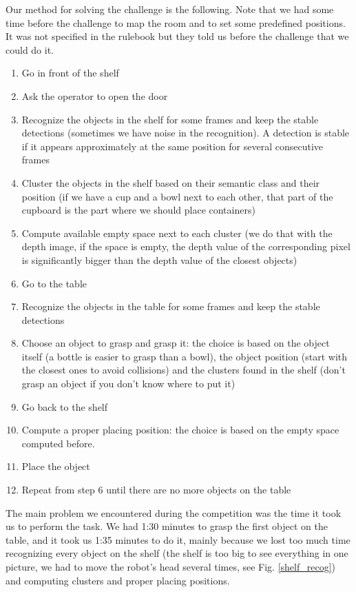 \documentclass[a4paper, twocolumn]{article}
\begin{document}
    Our method for solving the challenge is the following. Note that we had some time before the challenge to map the room and to set some predefined positions. It was not specified in the rulebook but they told us before the challenge that we could do it.
    \begin{enumerate}
        \item Go in front of the shelf
        \item Ask the operator to open the door
        \item Recognize the objects in the shelf for some frames and keep the stable detections (sometimes we have noise in the recognition). A detection is stable if it appears approximately at the same position for several consecutive frames
        \item Cluster the objects in the shelf based on their semantic class and their position (if we have a cup and a bowl next to each other, that part of the cupboard is the part where we should place containers)
        \item Compute available empty space next to each cluster (we do that with the depth image, if the space is empty, the depth value of the corresponding pixel is significantly bigger than the depth value of the closest objects)
        \item Go to the table
        \item Recognize the objects in the table for some frames and keep the stable detections
        \item Choose an object to grasp and grasp it: the choice is based on the object itself (a bottle is easier to grasp than a bowl), the object position (start with the closest ones to avoid collisions) and the clusters found in the shelf (don't grasp an object if you don't know where to put it)
        \item Go back to the shelf
        \item Compute a proper placing position: the choice is based on the empty space computed before.
        \item Place the object
        \item Repeat from step 6 until there are no more objects on the table
    \end{enumerate}

    The main problem we encountered during the competition was the time it took us to perform the task. We had 1:30 minutes to grasp the first object on the table, and it took us 1:35 minutes to do it, mainly because we lost too much time recognizing every object on the shelf (the shelf is too big to see everything in one picture, we had to move the robot's head several times, see Fig. \ref{shelf_recog}) and computing clusters and proper placing positions.
\end{document}

